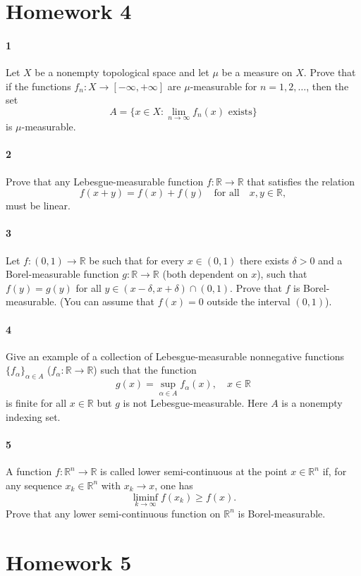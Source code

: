 \documentclass[12pt]{article}
\newlength{\myparskip}
\newenvironment{fullbox}{\begin{lrbox}{\savefullbox}\begin{minipage}{\dimexpr\textwidth-2\fboxsep\relax}\setlength{\parskip}{\myparskip}}{\end{minipage}\end{lrbox}\framebox[\textwidth]{\usebox{\savefullbox}}}
\newenvironment{pbox}[1][]{\begin{fullbox}\ifx#1\empty\else\paragraph{#1}\phantom{}\fi}{\end{fullbox}}
\theoremstyle{definition}
\newcommand{\isp}[1]{\quad\text{#1}\quad}
\newcommand{\R}{\mathbb{R}}
\newcommand{\<}{\langle}
\renewcommand{\>}{\rangle}
\begin{document}
\section*{Homework 4}

\begin{pbox}[1]
    Let $X$ be a nonempty topological space and let $\mu$ be a measure on $X$.
    Prove that if the functions $f_n : X \to [-\infty, +\infty]$ are $\mu$-measurable for $n = 1, 2, \dots$, then the set
    \[
        A = \{x \in X : \lim_{n \to \infty} f_n(x) \text{ exists}\}
    \]
    is $\mu$-measurable.
\end{pbox}

\begin{pbox}[2]
    Prove that any Lebesgue-measurable function $f : \R \to \R$ that satisfies the relation
    \[
        f(x + y) = f(x) + f(y) \isp{for all} x, y \in \R,
    \]
    must be linear.
\end{pbox}

\begin{pbox}[3]
    Let $f : (0, 1) \to \R$ be such that for every $x \in (0, 1)$ there exists $\delta > 0$ and a Borel-measurable function $g : \R \to \R$ (both dependent on $x$), such that $f(y) = g(y)$ for all $y \in (x - \delta, x + \delta) \cap (0, 1)$. Prove that $f$ is Borel-measurable. (You can assume that $f(x) = 0$ outside the interval $(0, 1)$).
\end{pbox}

\begin{pbox}[4]
    Give an example of a collection of Lebesgue-measurable nonnegative functions $\{f_\alpha\}_{\alpha \in A}$ ($f_\alpha : \R \to \R$) such that the function
    \[
        g(x) = \sup_{\alpha \in A} f_\alpha(x), \quad x \in \R
    \]
    is finite for all $x \in \R$ but $g$ is not Lebesgue-measurable. Here $A$ is a nonempty indexing set.
\end{pbox}

\begin{pbox}[5]
    A function $f : \R^n \to \R$ is called lower semi-continuous at the point $x \in \R^n$ if, for any sequence $x_k \in \R^n$ with $x_k \to x$, one has
    \[
        \liminf_{k \to \infty} f(x_k) \geq f(x).
    \]
    Prove that any lower semi-continuous function on $\R^n$ is Borel-measurable.
\end{pbox}

\section*{Homework 5}
\end{document}

